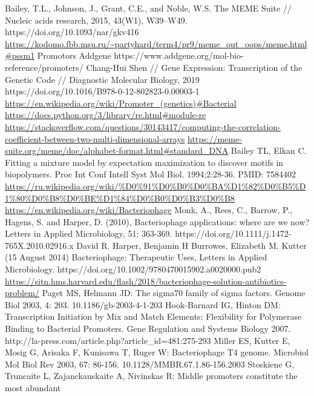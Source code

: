 \documentclass[14pt]{extarticle}
\begin{document}
\begin{thebibliography}{9}
     Bailey, T.L., Johnson, J., Grant, C.E., and Noble, W.S. The MEME Suite // Nucleic acids research,
    2015, 43(W1), W39–W49. https://doi.org/10.1093/nar/gkv416
     \url{https://kodomo.fbb.msu.ru/~partyhard/term4/pr9/meme_out_oops/meme.html#pssm1}
     Promotors Addgene https://www.addgene.org/mol-bio-reference/promoters/
     Chang-Hui Shen // Gene Expression: Transcription of the Genetic Code // Diagnostic Molecular 
    Biology, 2019 https://doi.org/10.1016/B978-0-12-802823-0.00003-1
     \url{https://en.wikipedia.org/wiki/Promoter_(genetics)#Bacterial}
     \url{https://docs.python.org/3/library/re.html#module-re}
     \url{https://stackoverflow.com/questions/30143417/computing-the-correlation-coefficient-between-two-multi-dimensional-arrays}
     \url{https://meme-suite.org/meme/doc/alphabet-format.html#standard_DNA}
     Bailey TL, Elkan C. Fitting a mixture model by expectation maximization to discover motifs in 
    biopolymers. Proc Int Conf Intell Syst Mol Biol. 1994;2:28-36. PMID: 7584402
     \url{https://ru.wikipedia.org/wiki/%D0%91%D0%B0%D0%BA%D1%82%D0%B5%D1%80%D0%B8%D0%BE%D1%84%D0%B0%D0%B3%D0%B8}
     \url{https://en.wikipedia.org/wiki/Bacteriophage}
     Monk, A., Rees, C., Barrow, P., Hagens, S. and Harper, D. (2010), Bacteriophage applications: 
    where are we now? Letters in Applied Microbiology, 51: 363-369. https://doi.org/10.1111/j.1472-765X.2010.02916.x
     David R. Harper, Benjamin H Burrowes, Elizabeth M. Kutter (15 August 2014) Bacteriophage: 
    Therapeutic Uses, Letters in Applied Microbiology.  https://doi.org/10.1002/9780470015902.a0020000.pub2
     \url{https://sitn.hms.harvard.edu/flash/2018/bacteriophage-solution-antibiotics-problem/}
     Paget MS, Helmann JD: The sigma70 family of sigma factors. Genome Biol 2003, 4: 203. 
    10.1186/gb-2003-4-1-203
     Hook-Barnard IG, Hinton DM: Transcription Initiation by Mix and Match Elements: Flexibility for 
    Polymerase Binding to Bacterial Promoters. Gene Regulation and Systems Biology 2007. 
    http://la-press.com/article.php?article\_id=481:275-293
     Miller ES, Kutter E, Mosig G, Arisaka F, Kunisawa T, Ruger W: Bacteriophage T4 genome. Microbiol Mol 
    Biol Rev 2003, 67: 86-156. 10.1128/MMBR.67.1.86-156.2003
     Stoskiene G, Truncaite L, Zajanckauskaite A, Nivinskas R: Middle promoters constitute the most abundant

\end{thebibliography}
\end{document}
